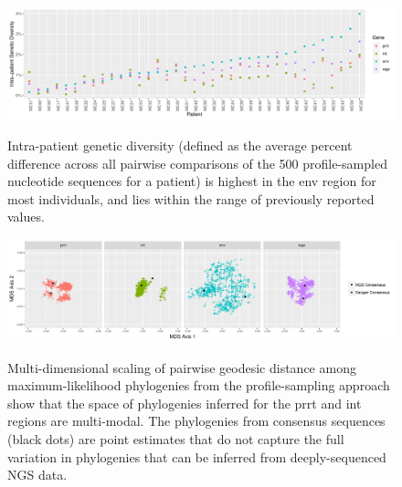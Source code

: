 \documentclass[letterpaper]{article}
\begin{document}
\begin{figure}[p!]
	\caption{Intra-patient genetic diversity (defined as the average percent difference across all pairwise comparisons of the 500 profile-sampled nucleotide sequences for a patient) is highest in the env region for most individuals, and lies within the range of previously reported values.}
	\centering
	\includegraphics[width=\linewidth]{Figure1}
	\label{fig1}
\end{figure}

\begin{figure}[p!]
	\caption{Multi-dimensional scaling of pairwise geodesic distance among maximum-likelihood phylogenies from the profile-sampling approach show that the space of phylogenies inferred for the prrt and int regions are multi-modal. The phylogenies from consensus sequences (black dots) are point estimates that do not capture the full variation in phylogenies that can be inferred from deeply-sequenced NGS data.}
	\centering
	\includegraphics[width=\linewidth]{Figure2}
	\label{fig2}
\end{figure}
	
\end{document}
